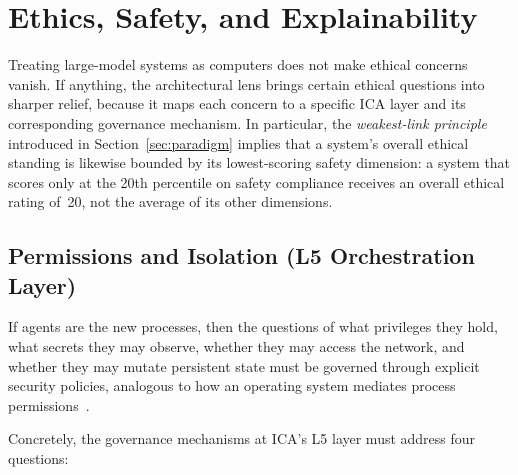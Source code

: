 \section{Ethics, Safety, and Explainability}
\label{sec:ethics}

Treating large-model systems as computers does not make ethical concerns vanish.  If anything, the architectural lens brings certain ethical questions into sharper relief, because it maps each concern to a specific ICA layer and its corresponding governance mechanism.  In particular, the \emph{weakest-link principle} introduced in Section~\ref{sec:paradigm} implies that a system's overall ethical standing is likewise bounded by its lowest-scoring safety dimension: a system that scores only at the 20th percentile on safety compliance receives an overall ethical rating of~20, not the average of its other dimensions.

\subsection{Permissions and Isolation (L5 Orchestration Layer)}
\label{sec:ethics-permission}

If agents are the new processes, then the questions of what privileges they hold, what secrets they may observe, whether they may access the network, and whether they may mutate persistent state must be governed through explicit security policies, analogous to how an operating system mediates process permissions~\cite{openai_codex_approvals_2026,openai_codex_sandbox_2026,anthropic_claudecode_security_2026,anthropic_claudecode_sandbox_2026,debenedetti2025camel,ironclaw2025}.

Concretely, the governance mechanisms at ICA's L5 layer must address four questions:

